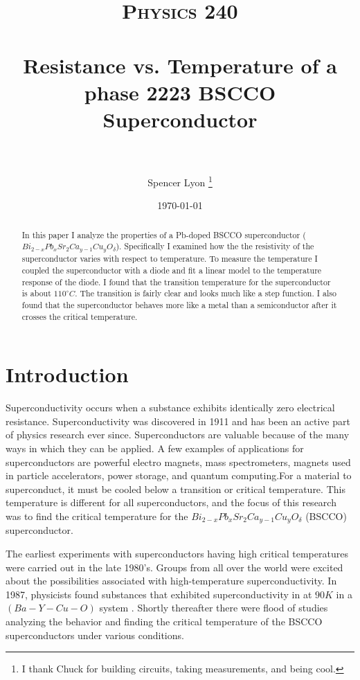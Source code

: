 \documentclass[paper=a4, fontsize=11pt]{scrartcl}
\title{
    \vspace{-.3in}
    \usefont{OT1}{bch}{b}{n}
    \normalfont \normalsize \textsc{Physics 240} \\ [25pt]
    \horrule{0.5pt} \\[0.4cm]
    \huge Resistance vs. Temperature of a phase 2223 BSCCO Superconductor \\
    \horrule{2pt} \\[0.5cm]
  }
\author{
    Spencer Lyon
    \thanks{I thank Chuck for building circuits, taking measurements, and being cool.}
  }
\date{
  \normalfont \normalsize
  \today \\[-4pt] \normalsize
  }
\numberwithin{equation}{section}
\numberwithin{figure}{section}
\numberwithin{table}{section}
\begin{document}
  \begin{titlepage}
      \pagestyle{empty}
      \maketitle

      \begin{abstract}
            \begin{center}
            \small{
                  In this paper I analyze the properties of a Pb-doped BSCCO superconductor ($Bi_{2-x}Pb_xSr_2Ca_{y-1}Cu_yO_{\delta}$). Specifically I examined how the the resistivity of the superconductor varies with respect to temperature. To measure the temperature I coupled the superconductor with a diode and fit a linear model to the temperature response of the diode. I found that the transition temperature for the superconductor is about $110^{\circ} C$. The transition is fairly clear and looks much like a step function. I also found that the superconductor behaves more like a metal than a semiconductor after it crosses the critical temperature.
            }
            \end{center}
      \end{abstract}
  \end{titlepage}

  \pagestyle{fancyplain}
  \setcounter{page}{1}

  \section{Introduction}

      Superconductivity occurs when a substance exhibits identically zero electrical resistance. Superconductivity was discovered in 1911 and has been an active part of physics research ever since. Superconductors are valuable because of the many ways in which they can be applied. A few examples of applications for superconductors are powerful electro magnets, mass spectrometers, magnets used in particle accelerators, power storage, and quantum computing.For a material to superconduct, it must be cooled below a transition or critical temperature. This temperature is different for all superconductors, and the focus of this research was to find the critical temperature for the $Bi_{2-x}Pb_xSr_2Ca_{y-1}Cu_yO_{\delta}$ (BSCCO) superconductor.

      The earliest experiments with superconductors having high critical temperatures were carried out in the late 1980's. Groups from all over the world were excited about the possibilities associated with high-temperature superconductivity. In 1987, physicists found substances that exhibited superconductivity in at $90K$ in a $(Ba-Y-Cu-O)$ system \citep{Ashburn:1987}. Shortly thereafter there were flood of studies analyzing the behavior and finding the critical temperature of the BSCCO superconductors under various conditions.
\end{document}
